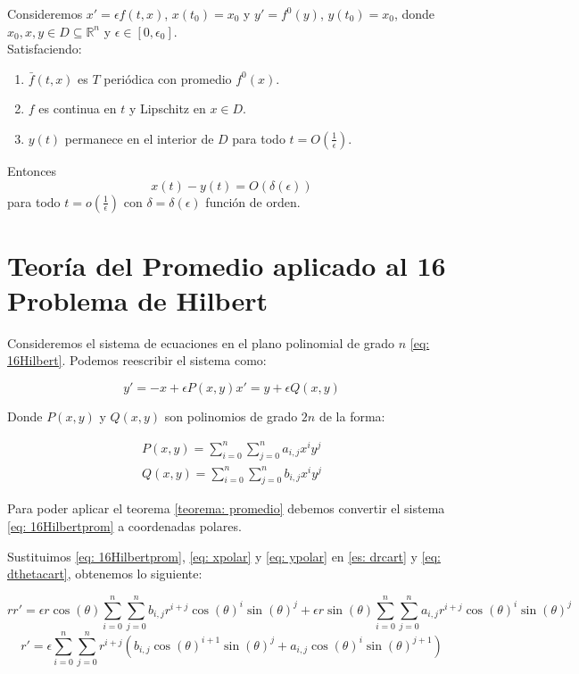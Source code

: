 \begin{theorem}\label{teorema: promedio}
	Consideremos $x'=\epsilon f(t,x)$, $x(t_0)=x_0$ y $y'=f^0(y)$, $y(t_0)=x_0$,
	donde $x_0,x,y\in D\subseteq\mathbb{R}^n$ y $\epsilon\in[0,\epsilon_0]$.\\

	Satisfaciendo:
	\begin{enumerate}
		\item $\bar{f}(t,x)$ es $T$ periódica con promedio $f^0(x)$.
		\item $f$ es continua en $t$ y Lipschitz en $x\in D$.
		\item $y(t)$ permanece en el interior de $D$ para todo $t=O(\frac{1}{\epsilon})$.
	\end{enumerate}
	Entonces
	\[x(t)-y(t)=O(\delta(\epsilon))\]
	para todo $t=o(\frac{1}{\epsilon})$ con $\delta=\delta(\epsilon)$ función de orden.
\end{theorem}

\section{Teoría del Promedio aplicado al 16 Problema de Hilbert}

Consideremos el sistema de ecuaciones en el plano polinomial de grado $n$ \eqref{eq: 16Hilbert}. Podemos reescribir el sistema como:

\begin{equation}\label{eq: 16Hilbertprom}
	y'= -x + \epsilon P(x,y)
	x'=y + \epsilon Q(x,y)
\end{equation}

Donde $P(x,y)$ y $Q(x,y)$ son polinomios de grado $2n$ de la forma:

\begin{equation}\label{eq: 16Hilbertprompol}
	\begin{matrix}
		P(x,y) = \sum_{i=0}^{n} \sum_{j=0}^{n} a_{i,j} x^i y^j \\
		Q(x,y) = \sum_{i=0}^{n} \sum_{j=0}^{n} b_{i,j} x^i y^j
	\end{matrix}
\end{equation}

Para poder aplicar el teorema \ref{teorema: promedio} debemos convertir el sistema \eqref{eq: 16Hilbertprom} a coordenadas polares.

Sustituimos \eqref{eq: 16Hilbertprom}, \eqref{eq: xpolar} y \eqref{eq: ypolar} en \eqref{es: drcart} y \eqref{eq: dthetacart}, obtenemos lo siguiente:

\[
 rr'=\epsilon r\cos(\theta)\sum_{i=0}^{n}\sum_{j=0}^{n}b_{i,j}r^{i+j}\cos(\theta)^i\sin(\theta)^j + \epsilon r\sin(\theta)\sum_{i=0}^{n}\sum_{j=0}^{n}a_{i,j}r^{i+j}\cos(\theta)^i\sin(\theta)^j
\]
\begin{equation}\label{eq: rpolhilbert}
 r'=\epsilon\sum_{i=0}^{n}\sum_{j=0}^{n}r^{i+j}(b_{i,j}\cos(\theta)^{i+1}\sin(\theta)^j+a_{i,j}\cos(\theta)^i\sin(\theta)^{j+1})
\end{equation}

